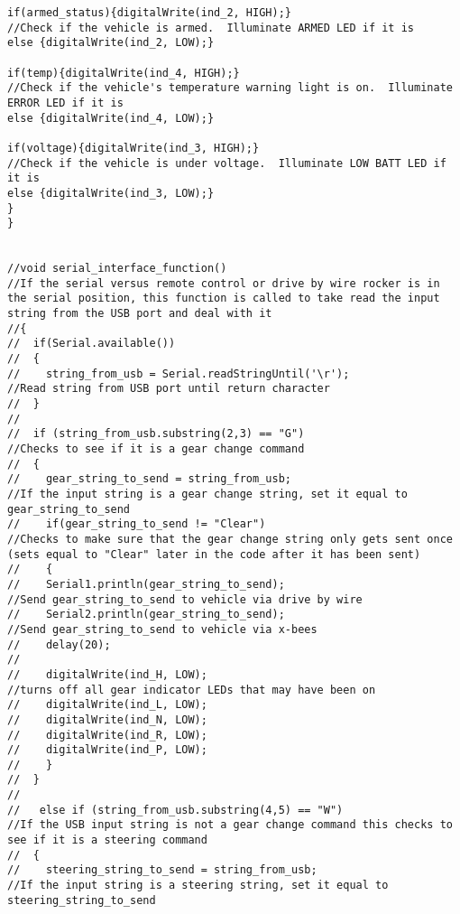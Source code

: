 \begin{lstlisting}[breaklines=true,basicstyle=\tiny]
if(armed_status){digitalWrite(ind_2, HIGH);}                                //Check if the vehicle is armed.  Illuminate ARMED LED if it is
else {digitalWrite(ind_2, LOW);}

if(temp){digitalWrite(ind_4, HIGH);}                                        //Check if the vehicle's temperature warning light is on.  Illuminate ERROR LED if it is
else {digitalWrite(ind_4, LOW);}

if(voltage){digitalWrite(ind_3, HIGH);}                                     //Check if the vehicle is under voltage.  Illuminate LOW BATT LED if it is
else {digitalWrite(ind_3, LOW);}
}
}


//void serial_interface_function()                                                     //If the serial versus remote control or drive by wire rocker is in the serial position, this function is called to take read the input string from the USB port and deal with it
//{
//  if(Serial.available())
//  {
//    string_from_usb = Serial.readStringUntil('\r');                                  //Read string from USB port until return character
//  }
//  
//  if (string_from_usb.substring(2,3) == "G")                                         //Checks to see if it is a gear change command
//  {
//    gear_string_to_send = string_from_usb;                                           //If the input string is a gear change string, set it equal to gear_string_to_send
//    if(gear_string_to_send != "Clear")                                               //Checks to make sure that the gear change string only gets sent once (sets equal to "Clear" later in the code after it has been sent)
//    {
//    Serial1.println(gear_string_to_send);                                            //Send gear_string_to_send to vehicle via drive by wire
//    Serial2.println(gear_string_to_send);                                           //Send gear_string_to_send to vehicle via x-bees
//    delay(20);
//    
//    digitalWrite(ind_H, LOW);                                                        //turns off all gear indicator LEDs that may have been on
//    digitalWrite(ind_L, LOW);
//    digitalWrite(ind_N, LOW);
//    digitalWrite(ind_R, LOW);
//    digitalWrite(ind_P, LOW);
//    }
//  }
//  
//   else if (string_from_usb.substring(4,5) == "W")                                   //If the USB input string is not a gear change command this checks to see if it is a steering command 
//  {
//    steering_string_to_send = string_from_usb;                                       //If the input string is a steering string, set it equal to steering_string_to_send

\end{lstlisting}

